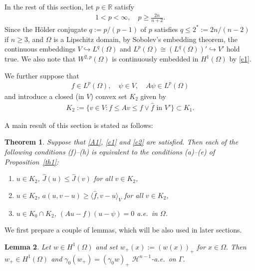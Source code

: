 \documentclass[reqno,10pt]{amsart}
\newtheorem{Th}{Theorem}[section]
\newtheorem{Lem}[Th]{Lemma}
\begin{document}
In the rest of this section, let $p\in{{\mathbb R}}$ satisfy
\begin{align}\label{c1}
1<p<\infty,
\quad
p\ge \frac{2n}{n+2}.
\end{align}
Since the H\"{o}lder conjugate $q:=p/(p-1)$ of $p$ satisfies $q\le
2^*:=2n/(n-2)$ if $n\ge 3$, and $\Omega$ is a Lipschitz domain, by Sobolev's
embedding theorem, the continuous embeddings $V\hookrightarrow
L^q(\Omega)$ and $L^p(\Omega) \cong (L^q(\Omega))' \hookrightarrow V'$
hold true. We also note that $W^{2,p}(\Omega)$ is continuously embedded in
$H^1(\Omega)$ by \eqref{c1}.

We further suppose that
\begin{align}\label{c2}
f\in L^p(\Omega),
\quad
\psi \in V, 
\quad
A\psi \in L^p(\Omega)
\end{align}
and introduce a closed (in $V$) convex set $K_2$ given by 
\begin{align*}
K_2:=\{v\in V \colon f\le Av\le f \vee \hat{f} \mbox{ in }V'
 \}\subset K_1.
\end{align*}

A main result of this section is stated as follows:

\begin{Th}\label{th2}
Suppose that \eqref{A1}, \eqref{c1} and \eqref{c2} are satisfied. Then each of
 the following conditions {\rm (f)--(h)} is equivalent to the conditions
 {\rm (a)--(e)} of Proposition~\ref{th1}\/{\rm :} 
\begin{enumerate}
\item[{\rm (f)}]
$u\in K_2$, $\hat{J}(u)\le \hat{J}(v)$ for all $v\in K_2$,
\item[{\rm (g)}]
$u\in K_2$, $a(u,v-u)\ge \langle \hat{f},v-u\rangle_V$ for all $v\in
	     K_2$,
\item[{\rm (h)}]
$u\in K_0\cap K_2$, $(Au-f)(u-\psi)=0$ a.e.~in
	     $\Omega$.
\end{enumerate}
\end{Th}

We first prepare a couple of lemmas, which will be also used
in later sections.
\begin{Lem}\label{lem-trace}
Let $w\in H^1(\Omega)$ and set $w_+(x):=(w(x))_+$ for $x \in
 \Omega$. Then $w_+\in H^1(\Omega)$ and $\gamma_0(w_+)=(\gamma_0w)_+$
 ${{\mathcal H}}^{n-1}$-a.e.~on $\Gamma$.
\end{Lem}
\end{document}
